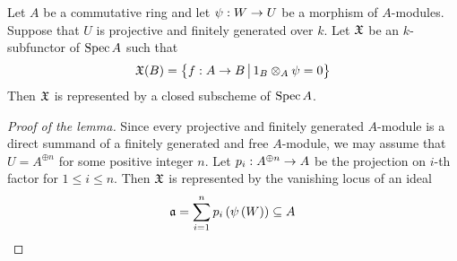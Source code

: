 \begin{lemma}\label{lemma:representability_of_vanishing_locus}
Let $A$ be a commutative ring and let $\psi:W\rightarrow U$ be a morphism of $A$-modules. Suppose that $U$ is projective and finitely generated over $k$. Let ${\mathfrak X}$ be an $k$-subfunctor of $\mathrm{Spec}\, A$ such that
$${\mathfrak X}(B) = \big\{f:A\rightarrow B\,\big|\,1_B\otimes_A\psi = 0\big\}$$
Then ${\mathfrak X}$ is represented by a closed subscheme of $\mathrm{Spec}\, A$.
\end{lemma}
\begin{proof}[Proof of the lemma]
Since every projective and finitely generated $A$-module is a direct summand of a finitely generated and free $A$-module, we may assume that $U = A^{\oplus n}$ for some positive integer $n$. Let $p_i:A^{\oplus n}\rightarrow A$ be the projection on $i$-th factor for $1\leq i\leq n$. Then ${\mathfrak X}$ is represented by the vanishing locus of an ideal
$$\mathfrak{a} = \sum_{i=1}^n p_i\left(\psi\left(W\right)\right) \subseteq A$$
\end{proof}

